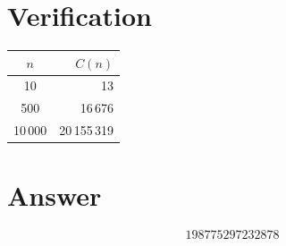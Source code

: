 \documentclass[11pt]{article}
\begin{document}
\section{Verification}

\begin{center}
\begin{tabular}{cr}
\toprule
$n$ & $C(n)$ \\
\midrule
10 & 13 \\
500 & 16\,676 \\
10\,000 & 20\,155\,319 \\
\bottomrule
\end{tabular}
\end{center}

\section{Answer}

\[
\boxed{198775297232878}
\]
\end{document}
